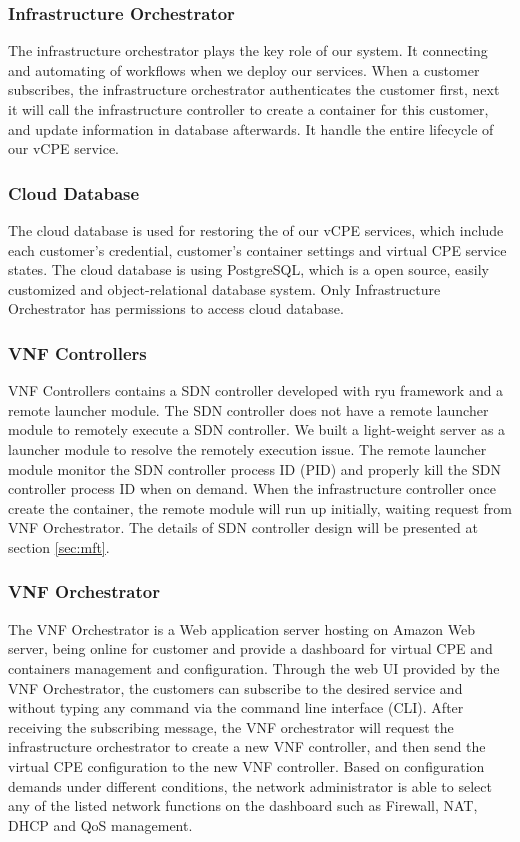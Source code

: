 \documentclass[journal]{IEEEtran}
\begin{document}
\subsubsection{Infrastructure Orchestrator}

The infrastructure orchestrator plays the key role of our system. It connecting and automating of workflows when we deploy our services. When a customer subscribes, the infrastructure orchestrator authenticates the customer first, next it will call the infrastructure controller to create a container for this customer, and update information in database afterwards. It handle the entire lifecycle of our vCPE service.

\subsubsection{Cloud Database}

The cloud database is used for restoring the of our vCPE services, which include each customer’s credential, customer’s container settings and virtual CPE service states. The cloud database is using PostgreSQL, which is a open source, easily customized and object-relational database system. Only Infrastructure Orchestrator has permissions to access cloud database.

\subsubsection{VNF Controllers}

VNF Controllers contains a SDN controller developed with ryu framework \cite{web:ryu} and a remote launcher module. The SDN controller does not have a remote launcher module to remotely execute a SDN controller. We built a light-weight server as a launcher module to resolve the remotely execution issue. The remote launcher module monitor the SDN controller process ID (PID) and properly kill the SDN controller process ID when on demand. When the infrastructure controller once create the container, the remote module will run up initially, waiting request from VNF Orchestrator. The details of SDN controller design will be presented at section \ref{sec:mft}.

\subsubsection{VNF Orchestrator}

The VNF Orchestrator is a Web application server hosting on Amazon Web server, being online for customer and provide a dashboard for virtual CPE and containers management and configuration.
Through the web UI provided by the VNF Orchestrator, the customers can subscribe to the desired service and without typing any command via the command line interface (CLI). After receiving the subscribing message, the VNF orchestrator will request the infrastructure orchestrator to create a new VNF controller, and then send the virtual CPE configuration to the new VNF controller. Based on configuration demands under different conditions, the network administrator is able to select any of the listed network functions on the dashboard such as Firewall, NAT, DHCP and QoS management.
\end{document}
